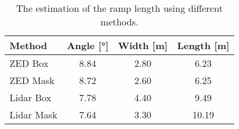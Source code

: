 \begin{table}[htb]
	\centering
	\caption[Ramp length]{The estimation of the ramp length using different methods.}
	\label{tab:cloud_extraction_estimation}
	\begin{tabular}[t]{lccc}
		\toprule
		\textbf{Method} & \textbf{Angle} [\si{\degree}] & \textbf{Width} [\si{\metre}] & \textbf{Length} [\si{\metre}] \\
		\midrule
		ZED Box         & \SI{8.84}{}                   & \SI{2.80}{}                  & \SI{6.23}[]{}                 \\
		ZED Mask        & \SI{8.72}{}                   & \SI{2.60}{}                  & \SI{6.25}[]{}                 \\
		Lidar Box       & \SI{7.78}{}                   & \SI{4.40}{}                  & \SI{9.49}[]{}                 \\
		Lidar Mask      & \SI{7.64}{}                   & \SI{3.30}{}                  & \SI{10.19}[]{}                \\
		\bottomrule
	\end{tabular}
\end{table}